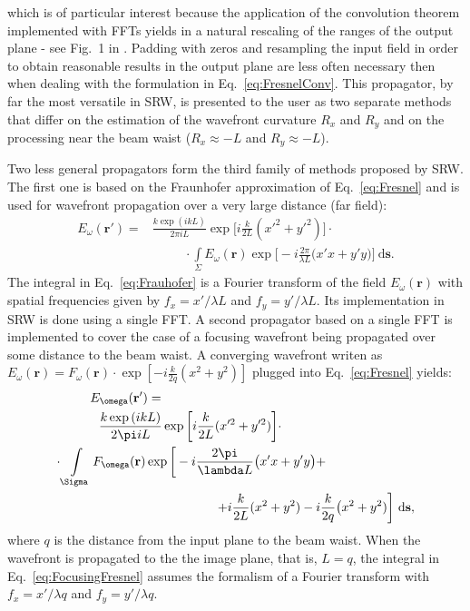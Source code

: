 \documentclass{iucr}              %
\begin{document}
which is of particular interest because the application of the convolution theorem implemented with FFTs yields in a natural rescaling of the ranges of the output plane - see Fig.~1 in \cite{ChubarCelestre}. Padding with zeros and resampling the input field in order to obtain reasonable results in the output plane are less often necessary then when dealing with the formulation in Eq.~\ref{eq:FresnelConv}. This propagator, by far the most versatile in SRW, is presented to the user as two separate methods that differ on the estimation of the wavefront curvature $R_x$ and $R_y$ and on the processing near the beam waist ($R_x\approx-L$ and $R_y\approx-L$). 

Two less general propagators form the third family of methods proposed by SRW. The first one is based on the Fraunhofer approximation of Eq.~\ref{eq:Fresnel} and is used for wavefront propagation over a very large distance (far field):
 \begin{equation}\label{eq:Frauhofer}
\begin{split}
    E_\omega(\textbf{r}') = &\frac{k\exp{(ikL)}}{2\pi i L}\exp{\bigg[i\frac{k}{2L}(x'^2 + y'^2)\bigg]}\cdot \\
    &\enspace\qquad\cdot\int\limits_{\Sigma}{E_\omega(\textbf{r})\exp{\bigg[-i \frac{2\pi}{\lambda L}\big( x'x + y'y \big)\bigg]}~\mathrm{d}\textbf{s}}.
\end{split}
\end{equation}
The integral in Eq.~\ref{eq:Frauhofer} is a Fourier transform of the field $E_\omega(\textbf{r})$ with spatial frequencies given by $f_x=x'\big/\lambda L$ and $f_y=y'\big/\lambda L$. Its implementation in SRW is done using a single FFT. A second propagator based on a single FFT is implemented to cover the case of a focusing wavefront being propagated over some distance to the beam waist. A converging wavefront writen as $E_\omega(\textbf{r}) = F_\omega(\textbf{r})\cdot\exp{[-i\frac{k}{2q}(x^2 + y^2)]}$ plugged into Eq.~\ref{eq:Fresnel} yields:
\begin{equation}\label{eq:FocusingFresnel}
\begin{split}
E_\omega(\textbf{r}') = \qquad\qquad\qquad\qquad\qquad\qquad\qquad\qquad\qquad\qquad &\\
\frac{k\exp{(ikL)}}{2\pi i L}\exp{\bigg[i\frac{k}{2L}(x'^2 + y'^2)\bigg]}\cdot \qquad\qquad\qquad\qquad\qquad\enspace &\\
\cdot\int\limits_{\Sigma}{F_\omega(\textbf{r})\exp{\bigg[-i \frac{2\pi}{\lambda L}\big( x'x + y'y \big) +}} \qquad\qquad\qquad\quad&\\
\hfill+i\frac{k}{2L}(x^2 + y^2) - i \frac{k}{2 q}\big(x^2+y^2) \bigg]~\mathrm{d}\textbf{s},&
\end{split}
\end{equation}
where $q$ is the distance from the input plane to the beam waist. When the wavefront is propagated to the the image plane, that is, $L=q$, the integral in Eq.~\ref{eq:FocusingFresnel} assumes the formalism of a Fourier transform with $f_x=x'\big/\lambda q$ and $f_y=y'\big/\lambda q$. 
\end{document}

